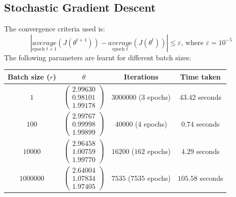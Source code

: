 \documentclass[11pt]{article}
\begin{document}
\subsection{Stochastic Gradient Descent}
The convergence criteria used is:
\begin{equation}
    |\underset{\text{epoch }t+1}{average}(J(\theta^{t+1})) - \underset{\text{epoch }t}{average}(J(\theta^t))| \leq \varepsilon\text{, where }\varepsilon=10^{-5}
\end{equation}
The following parameters are learnt for different batch sizes:
\begin{center}
    \begin{tabular}{c c c c}
        \toprule
        \textbf{Batch size ($r$)} & \textbf{$\theta$} & \textbf{Iterations} & \textbf{Time taken}\\
        \midrule
        \midrule
        $1$ &
        $\begin{pmatrix}
            2.99630\\
            0.98101\\
            1.99178
        \end{pmatrix}$
        & $3000000$ ($3$ epochs) & $43.42$ seconds\\
        \midrule
        $100$ &
        $\begin{pmatrix}
            2.99767\\
            0.99998\\
            1.99899
        \end{pmatrix}$
        & $40000$ ($4$ epochs) & $0.74$ seconds\\
        \midrule
        $10000$ &
        $\begin{pmatrix}
            2.96458\\
            1.00759\\
            1.99770
        \end{pmatrix}$
        & $16200$ ($162$ epochs) & $4.29$ seconds\\
        \midrule
        $1000000$ &
        $\begin{pmatrix}
            2.64004\\
            1.07834\\
            1.97405
        \end{pmatrix}$
        & $7535$ ($7535$ epochs) & $105.58$ seconds\\
        \bottomrule
    \end{tabular}
\end{center}
\end{document}
